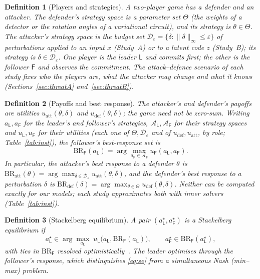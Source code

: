 \documentclass[conference]{IEEEtran}
\newtheorem{definition}{Definition}
\newcommand{\BR}{\mathrm{BR}}
\begin{document}
\begin{definition}[Players and strategies]\label{def:players}
A two-player game has a \emph{defender} and an \emph{attacker}. The defender's \emph{strategy space} is a parameter set $\Theta$ (the weights of a detector or the rotation angles of a variational circuit), and its strategy is $\theta\in\Theta$. The attacker's strategy space is the budget set $\mathcal D_\varepsilon=\{\delta:\|\delta\|_\infty\le\varepsilon\}$ of perturbations applied to an input $x$ (Study~A) or to a latent code $z$ (Study~B); its strategy is $\delta\in\mathcal D_\varepsilon$. One player is the \emph{leader} $\mathsf{L}$ and commits first; the other is the \emph{follower} $\mathsf{F}$ and observes the commitment. The attack--defence scenario of each study fixes who the players are, what the attacker may change and what it knows (Sections~\ref{sec:threatA} and~\ref{sec:threatB}).
\end{definition}

\begin{definition}[Payoffs and best response]\label{def:br}
The attacker's and defender's payoffs are utilities $u_{\mathrm{att}}(\theta,\delta)$ and $u_{\mathrm{def}}(\theta,\delta)$; the game need not be zero-sum. Writing $a_{\mathsf L},a_{\mathsf F}$ for the leader's and follower's strategies, $\mathcal A_{\mathsf L},\mathcal A_{\mathsf F}$ for their strategy spaces and $u_{\mathsf L},u_{\mathsf F}$ for their utilities (each one of $\Theta,\mathcal D_\varepsilon$ and of $u_{\mathrm{def}},u_{\mathrm{att}}$, by role; Table~\ref{tab:inst}), the follower's best-response set is
\begin{equation}
\BR_{\mathsf{F}}(a_{\mathsf{L}})=\arg\max_{a_{\mathsf{F}}\in\mathcal{A}_{\mathsf{F}}} u_{\mathsf{F}}(a_{\mathsf{L}},a_{\mathsf{F}}).
\label{eq:br}
\end{equation}
In particular, the attacker's best response to a defender $\theta$ is $\BR_{\mathrm{att}}(\theta)=\arg\max_{\delta\in\mathcal D_\varepsilon}u_{\mathrm{att}}(\theta,\delta)$, and the defender's best response to a perturbation $\delta$ is $\BR_{\mathrm{def}}(\delta)=\arg\max_{\theta\in\Theta}u_{\mathrm{def}}(\theta,\delta)$. Neither can be computed exactly for our models; each study approximates both with inner solvers (Table~\ref{tab:inst}).
\end{definition}

\begin{definition}[Stackelberg equilibrium]\label{def:se}
A pair $(a^\star_{\mathsf{L}},a^\star_{\mathsf{F}})$ is a Stackelberg equilibrium if
\begin{equation}
a^\star_{\mathsf{L}}\in\arg\max_{a_{\mathsf{L}}}\; u_{\mathsf{L}}\big(a_{\mathsf{L}},\BR_{\mathsf{F}}(a_{\mathsf{L}})\big),\qquad a^\star_{\mathsf{F}}\in\BR_{\mathsf{F}}(a^\star_{\mathsf{L}}),
\label{eq:se}
\end{equation}
with ties in $\BR_{\mathsf{F}}$ resolved optimistically~\cite{basar1999}. The leader optimises \emph{through} the follower's response, which distinguishes \eqref{eq:se} from a simultaneous Nash (min--max) problem.
\end{definition}
\end{document}
